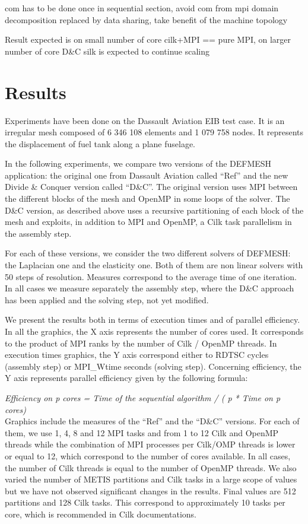 \documentclass{IOS-Book-Article}
\begin{document}
com has to be done once in sequential section, avoid com from mpi domain decomposition replaced by data sharing, take benefit of the machine topology


Result expected is on small number of core cilk+MPI == pure MPI, on larger number of core D\&C silk is expected to continue scaling

\section{Results}


Experiments have been done on the Dassault Aviation EIB test case. It is an irregular mesh composed of 6 346 108 elements and 1 079 758 nodes.
It represents the displacement of fuel tank along a plane fuselage.

In the following experiments, we compare two versions of the DEFMESH application: the original one from Dassault Aviation called “Ref” and the new
Divide \& Conquer version called “D\&C”. The original version uses MPI between the different blocks of the mesh and OpenMP in some loops of the solver.
The D\&C version, as described above uses a recursive partitioning of each block of the mesh and exploits, in addition to MPI and OpenMP, a Cilk task parallelism
in the assembly step.

For each of these versions, we consider the two different solvers of DEFMESH: the Laplacian one and the elasticity one.
Both of them are non linear solvers with 50 steps of resolution. Measures correspond to the average time of one iteration.
In all cases we measure separately the assembly step, where the D\&C approach has been applied and the solving step, not yet modified.

We present the results both in terms of execution times and of parallel efficiency.
In all the graphics, the X axis represents the number of cores used. It corresponds to the product of MPI ranks by the number of Cilk / OpenMP threads.
In execution times graphics, the Y axis correspond either to RDTSC cycles (assembly step) or MPI\_Wtime seconds (solving step).
Concerning efficiency, the Y axis represents parallel efficiency given by the following formula:

\emph{Efficiency on p cores = Time of the sequential algorithm / ( p * Time on p cores)}\\

Graphics include the measures of the “Ref” and the “D\&C” versions.
For each of them, we use 1, 4, 8 and 12 MPI tasks and from 1 to 12 Cilk and OpenMP threads while the combination of MPI processes per Cilk/OMP threads is lower or equal to 12,
which correspond to the number of cores available. In all cases, the number of Cilk threads is equal to the number of OpenMP threads.
We also varied the number of METIS partitions and Cilk tasks in a large scope of values but we have not observed significant changes in the results.
Final values are 512 partitions and 128 Cilk tasks. This correspond to approximately 10 tasks per core, which is recommended in Cilk documentations.
\end{document}
